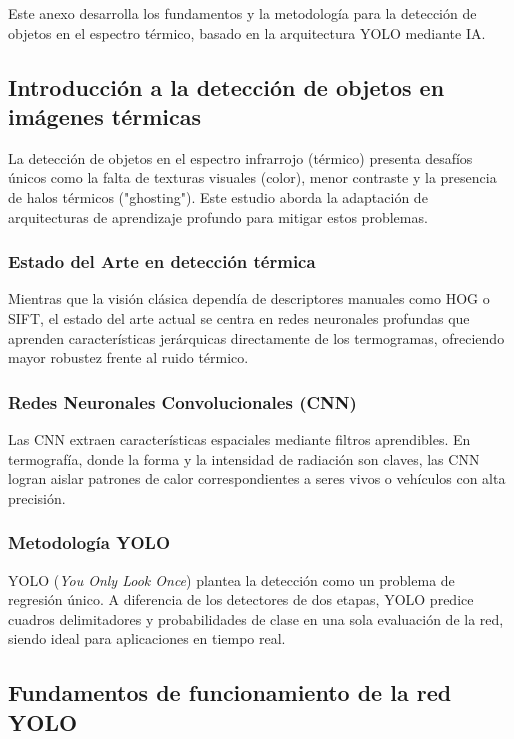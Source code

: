 \documentclass{article}
\begin{document}
Este anexo desarrolla los fundamentos y la metodología para la detección de objetos en el espectro térmico, basado en la arquitectura YOLO mediante IA.

\subsection{Introducción a la detección de objetos en imágenes térmicas}
La detección de objetos en el espectro infrarrojo (térmico) presenta desafíos únicos como la falta de texturas visuales (color), menor contraste y la presencia de halos térmicos ("ghosting"). Este estudio aborda la adaptación de arquitecturas de aprendizaje profundo para mitigar estos problemas.

\subsubsection{Estado del Arte en detección térmica}
Mientras que la visión clásica dependía de descriptores manuales como HOG o SIFT, el estado del arte actual se centra en redes neuronales profundas que aprenden características jerárquicas directamente de los termogramas, ofreciendo mayor robustez frente al ruido térmico.

\subsubsection{Redes Neuronales Convolucionales (CNN)}
Las CNN extraen características espaciales mediante filtros aprendibles. En termografía, donde la forma y la intensidad de radiación son claves, las CNN logran aislar patrones de calor correspondientes a seres vivos o vehículos con alta precisión.

\subsubsection{Metodología YOLO}
YOLO (\textit{You Only Look Once}) plantea la detección como un problema de regresión único. A diferencia de los detectores de dos etapas, YOLO predice cuadros delimitadores y probabilidades de clase en una sola evaluación de la red, siendo ideal para aplicaciones en tiempo real.

\subsection{Fundamentos de funcionamiento de la red YOLO}
\end{document}
